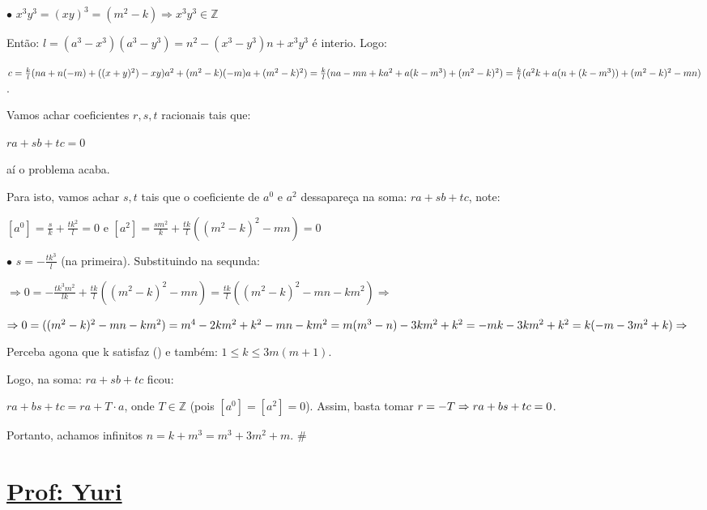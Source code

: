 \documentclass[a4paper,12pt]{article}
\renewcommand{\leq}{\ensuremath{\leqslant}}
\newcommand*{\hm}[1]{#1\nobreak\discretionary{}
	{\hbox{$\mathsurround=0pt #1$}}{}}
\theoremstyle{plain} %
\theoremstyle{definition} %
\theoremstyle{remark} %
\begin{document}
\begin{framed}
		$\bullet$ \hspace{1em} $x^3y^3=(xy)^3=(m^2-k)\Rightarrow x^3y^3\in\mathds{Z}$
		
		Ent\~ao: $l=(a^3-x^3)(a^3-y^3)=n^2-(x^3-y^3)n+x^3y^3$ \'e interio. Logo:
		
		$c=\frac{k}{l}(na+n(-m)+((x+y)^2)-xy)a^2+(m^2-k)(-m)a+(m^2-k)^2)\hm{=}\frac{k}{l}(na-mn+ka^2\hm{+}a(k-m^3)+(m^2-k)^2)\hm{=}\frac{k}{l}(a^2k+a(n+(k-m^3))+(m^2-k)^2-mn)$.
		
		Vamos achar coeficientes $r, s, t$ racionais tais que:
		
		\begin{center}
			$ra+sb+tc=0$
		\end{center}
		
		a\'i o problema acaba.
		
		Para isto, vamos achar $s,t$ tais que o coeficiente de $a^0$ e $a^2$ dessapare\c{c}a na soma: $ra+sb+tc$, note:
		
		$\displaystyle[a^0]=\frac{s}{k}+\frac{tk^2}{l}=0$ e $\displaystyle[a^2]=\frac{sm^2}{k}+\frac{tk}{l}\left((m^2-k)^2-mn\right)=0$
		
		\vspace{1ex}
		$\bullet$ \hspace{1em} $\displaystyle s=-\frac{tk^3}{l}$ (na primeira). Substituindo na sequnda:
		
		\vspace{1ex}
		$\displaystyle\Rightarrow 0=-\frac{tk^3m^2}{lk}+\frac{tk}{l}\left((m^2-k)^2-mn\right)=\frac{tk}{l}\left((m^2-k)^2-mn -km^2\right)\Rightarrow$
		
		\vspace{1ex}
		$\Rightarrow 0=((m^2-k)^2-mn -km^2)=m^4-2km^2+k^2-mn-km^2=m(m^3-n)\hm{-}3km^2+k^2\hm{=}-mk-3km^2+k^2=k(-m-3m^2+k)\Rightarrow$ 
		
		Perceba agona que k satisfaz (\textasteriskcentered) e tamb\'em: $1\leqslant k \leq 3m(m+1)$. 
		
		Logo, na soma: $ra+sb+tc$ ficou:
		
		$ra+bs+tc=ra+T\cdot a$, onde $T\in \mathds{Z}$ (pois $[a^0]=[a^2]=0$). Assim, basta tomar $r=-T\hm{\Rightarrow} ra+bs+tc=0$.
		
		Portanto, achamos infinitos $n=k+m^3=m^3+3m^2+m$. \huge\#
		
		\normalsize
		
	\end{framed}
	
	\newpage
	\section*{\underline{Prof: Yuri}}
	
\end{document}
